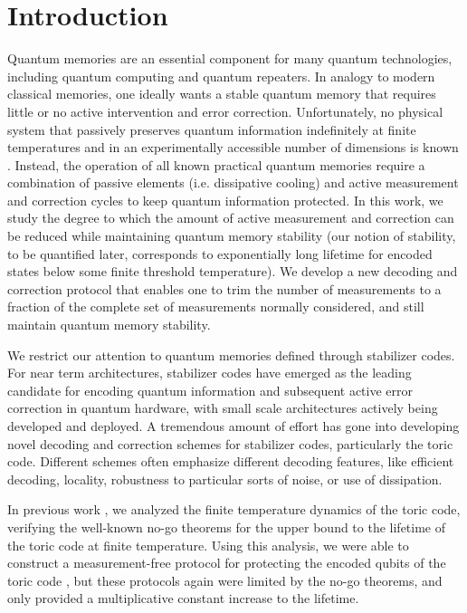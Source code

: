 \documentclass[twocolumn,superscriptaddress,aps,prb,floatfix]{revtex4-1}
\begin{document}
\section{Introduction}
\label{sec:Intro}
 Quantum memories are an essential component for many quantum technologies, including quantum computing and quantum repeaters. In analogy to modern classical memories, one ideally wants a stable quantum memory that requires little or no active intervention and error correction. Unfortunately, no physical system that passively preserves quantum information indefinitely at finite temperatures and in an experimentally accessible number of dimensions is known \cite{Terhal2015ks}. Instead, the operation of all known practical quantum memories require a combination of passive elements (i.e. dissipative cooling) and active measurement and correction cycles to keep quantum information protected.  In this work, we study the degree to which the amount of active measurement and correction can be reduced while maintaining quantum memory stability (our notion of stability, to be quantified later, corresponds to exponentially long lifetime for encoded states below some finite threshold temperature). We develop a new decoding and correction protocol that enables one to trim the number of measurements to a fraction of the complete set of measurements normally considered, and still maintain quantum memory stability. 
 
 We restrict our attention to quantum memories defined through stabilizer codes. For near term architectures, stabilizer codes\cite{Gottesman98} have emerged as the leading candidate for encoding quantum information and subsequent active error correction in quantum hardware, with small scale architectures actively being developed and deployed\cite{Knill2001,Takita2017,Chiaverini2004,Corcoles2015}.  A tremendous amount of effort has gone into developing novel decoding and correction schemes for stabilizer codes, particularly the toric code.  Different schemes often emphasize different decoding features, like efficient decoding\cite{Kovalev2013,Wang2009,Duclos-Cianci2010}, locality\cite{Breuckmann2016,Torlai2016,Harrington2004,Herold2014}, robustness to particular sorts of noise\cite{Novais2013,Bombin2012,Wootton2015}, or use of dissipation\cite{Freeman2017,Hutter2012a,Hutter2014,Fujii2014,Pedrocchi2013,Pedrocchi2011,Chesi2010a,Chesi2010b,Hamma2009,Herdman2010, Young2012,Weimer2010, Dengis2014, Kapit2015, Bardyn2015}.
 
 In previous work \cite{Freeman2014}, we analyzed the finite temperature dynamics of the toric code, verifying the well-known no-go theorems for the upper bound to the lifetime of the toric code at finite temperature\cite{Bravyi2009, Alicki2009a, Chesi2010b, Yoshida2011b, Hastings2011a, Landon-Cardinal2013, Temme2014, temme2015fast}.  Using this analysis, we were able to construct a measurement-free protocol for protecting the encoded qubits of the toric code \cite{Freeman2017}, but these protocols again were limited by the no-go theorems, and only provided a multiplicative constant increase to the lifetime.  
 
\end{document}
